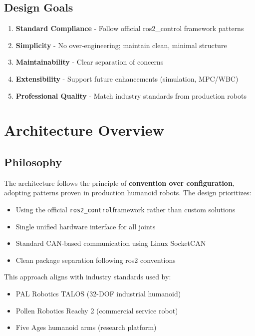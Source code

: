 \documentclass[12pt,a4paper]{article}
\newcommand{\code}[1]{\texttt{#1}}
\newcommand{\rc}{\code{ros2\_control}}
\begin{document}
\subsection{Design Goals}

\begin{enumerate}
    \item \textbf{Standard Compliance} - Follow official ros2\_control framework patterns
    \item \textbf{Simplicity} - No over-engineering; maintain clean, minimal structure
    \item \textbf{Maintainability} - Clear separation of concerns
    \item \textbf{Extensibility} - Support future enhancements (simulation, MPC/WBC)
    \item \textbf{Professional Quality} - Match industry standards from production robots
\end{enumerate}

\section{Architecture Overview}

\subsection{Philosophy}
The architecture follows the principle of \textbf{convention over configuration}, adopting 
patterns proven in production humanoid robots. The design prioritizes:

\begin{itemize}
    \item Using the official \rc framework rather than custom solutions
    \item Single unified hardware interface for all joints
    \item Standard CAN-based communication using Linux SocketCAN
    \item Clean package separation following ros2 conventions
\end{itemize}

This approach aligns with industry standards used by:
\begin{itemize}
    \item PAL Robotics TALOS (32-DOF industrial humanoid)
    \item Pollen Robotics Reachy 2 (commercial service robot)
    \item Five Ages humanoid arms (research platform)
\end{itemize}
\end{document}
